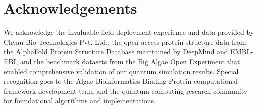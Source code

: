 \documentclass{article}
\begin{document}
\section*{Acknowledgements}
We acknowledge the invaluable field deployment experience and data provided by Chyau Bio Technologies Pvt. Ltd., the open-access protein structure data from the AlphaFold Protein Structure Database maintained by DeepMind and EMBL-EBI, and the benchmark datasets from the Big Algae Open Experiment that enabled comprehensive validation of our quantum simulation results. Special recognition goes to the Algae-Bioinformatics-Binding-Protein computational framework development team and the quantum computing research community for foundational algorithms and implementations.



\end{document}
